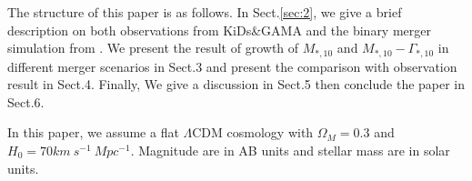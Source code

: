 \documentclass[fleqn,usenatbib]{mnras}
\begin{document}
\par The structure of this paper is as follows. In Sect.\ref{sec:2}, we give a brief description on both observations from KiDs\&GAMA and the binary merger simulation from \citep{nipoti2009}. We present the result of growth of $M_{*,10}$ and $M_{*,10}-\Gamma_{*,10}$ in different merger scenarios in Sect.3  and present the comparison with observation result in Sect.4. Finally, We give a discussion in Sect.5 then conclude the paper in Sect.6.
\par In this paper, we assume a flat $\Lambda$CDM cosmology with $\Omega_M = 0.3$ and $H_0 = 70 km ~s^{-1}~Mpc^{-1}$. Magnitude are in AB units and stellar mass are in solar units.
\end{document}
